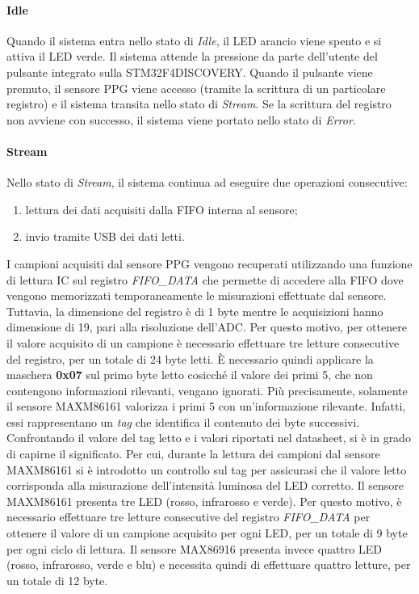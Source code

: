 \paragraph{Idle}
Quando il sistema entra nello stato di \textit{Idle}, il LED arancio viene spento e si attiva il LED verde. Il sistema attende la pressione da parte dell'utente del pulsante integrato sulla STM32F4DISCOVERY. Quando il pulsante viene premuto, il sensore PPG viene accesso (tramite la scrittura di un particolare registro) e il sistema transita nello stato di \textit{Stream}. Se la scrittura del registro non avviene con successo, il sistema viene portato nello stato di \textit{Error}.
\paragraph{Stream}
Nello stato di \textit{Stream}, il sistema continua ad eseguire due operazioni consecutive:
\begin{enumerate}
	\item lettura dei dati acquisiti dalla FIFO interna al sensore;
	\item invio tramite USB dei dati letti.
\end{enumerate}
I campioni acquisiti dal sensore PPG vengono recuperati utilizzando una funzione di lettura IC sul registro \textit{FIFO\_DATA} che permette di accedere alla FIFO dove vengono memorizzati temporaneamente le misurazioni effettuate dal sensore. Tuttavia, la dimensione del registro è di 1 byte mentre le acquisizioni hanno dimensione di \SI{19}{\bit}, pari alla risoluzione dell'ADC. Per questo motivo, per ottenere il valore acquisito di un campione è necessario effettuare tre letture consecutive del registro, per un totale di 24 byte letti. \`E necessario quindi applicare la maschera \textbf{0x07} sul primo byte letto cosicché il valore dei primi \SI{5}{\bit}, che non contengono informazioni rilevanti, vengano ignorati. Più precisamente, solamente il sensore MAXM86161 valorizza i primi \SI{5}{\bit} con un'informazione rilevante. Infatti, essi rappresentano un \textit{tag} che identifica il contenuto dei byte successivi. Confrontando il valore del tag letto e i valori riportati nel datasheet, si è in grado di capirne il significato. Per cui, durante la lettura dei campioni dal sensore MAXM86161 si è introdotto un controllo sul tag per assicurasi che il valore letto corrisponda alla misurazione dell'intensità luminosa del LED corretto. Il sensore MAXM86161 presenta tre LED (rosso, infrarosso e verde). Per questo motivo, è necessario effettuare tre letture consecutive del registro \textit{FIFO\_DATA} per ottenere il valore di un campione acquisito per ogni LED, per un totale di 9 byte per ogni ciclo di lettura. Il sensore MAX86916 presenta invece quattro LED (rosso, infrarosso, verde e blu) e necessita quindi di effettuare quattro letture, per un totale di 12 byte.

